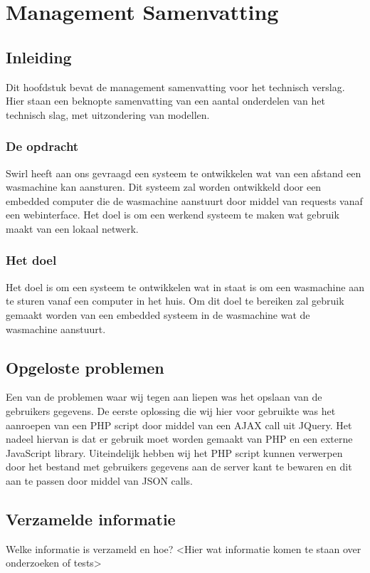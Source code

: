 \chapter{Management Samenvatting}
\newpage

\section{Inleiding}
Dit hoofdstuk bevat de management samenvatting voor het technisch verslag.
Hier staan een beknopte samenvatting van een aantal onderdelen van het technisch slag, met uitzondering van modellen.

\subsection{De opdracht}
Swirl \textregistered heeft aan ons gevraagd een systeem te ontwikkelen wat van een afstand een wasmachine kan aansturen.
Dit systeem zal worden ontwikkeld door een embedded computer die de wasmachine aanstuurt door middel van requests vanaf een webinterface.
Het doel is om een werkend systeem te maken wat gebruik maakt van een lokaal netwerk.

\subsection{Het doel}
Het doel is om een systeem te ontwikkelen wat in staat is om een wasmachine aan te sturen vanaf een computer in het huis.
Om dit doel te bereiken zal gebruik gemaakt worden van een embedded systeem in de wasmachine wat de wasmachine aanstuurt.

\section{Opgeloste problemen}
Een van de problemen waar wij tegen aan liepen was het opslaan van de gebruikers gegevens.
De eerste oplossing die wij hier voor gebruikte was het aanroepen van een PHP script door middel van een AJAX call uit JQuery.
Het nadeel hiervan is dat er gebruik moet worden gemaakt van PHP en een externe JavaScript library.
Uiteindelijk hebben wij het PHP script kunnen verwerpen door het bestand met gebruikers gegevens aan de server kant te bewaren en dit aan te passen door middel van JSON calls.

\section{Verzamelde informatie}
Welke informatie is verzameld en hoe?
<Hier wat informatie komen te staan over onderzoeken of tests>

